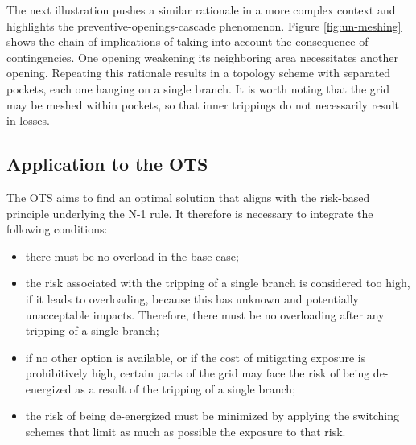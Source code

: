 The next illustration pushes a similar rationale in a more complex context and
highlights the preventive-openings-cascade phenomenon. Figure \ref{fig:un-meshing} shows the chain
of implications of taking into account the consequence of contingencies. One opening weakening its neighboring area necessitates another opening. Repeating this rationale results in a topology scheme with
separated pockets, each one hanging on a single branch.
It is worth noting that the grid may be meshed within pockets, so
that inner trippings do not necessarily result in losses.

\subsection{Application to the OTS}
The OTS aims to find an optimal solution that aligns with the risk-based principle underlying the N-1 rule. It therefore is necessary to integrate the following conditions:
\begin{itemize}
    \item there must be no overload in the base case;
    \item the risk associated with the tripping of a single branch is considered too high, if it leads to overloading, because this has unknown and potentially unacceptable impacts. Therefore, there must be no overloading after any tripping of a single branch;
    \item if no other option is available, or if the cost of mitigating exposure is prohibitively high, certain parts of the grid may face the risk of being de-energized as a result of the tripping of a single branch;
    \item the risk of being de-energized must be minimized by applying the switching schemes that limit as much as possible the exposure to that risk.
\end{itemize}